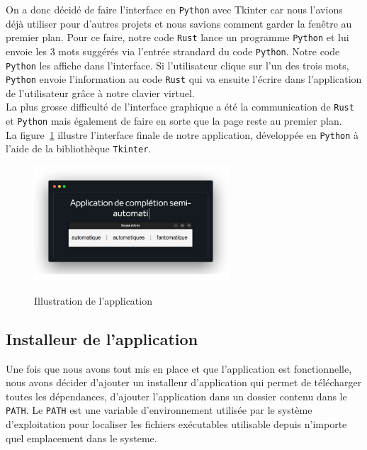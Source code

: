 \documentclass[a4paper, 11pt]{report}
\newcommand{\langage}[1]{\texttt{#1}}
\begin{document}
{On a donc décidé de faire l'interface en \langage{Python} avec Tkinter car nous l'avions déjà utiliser pour d'autres projets et nous savions comment garder la fenêtre au premier plan. Pour ce faire, notre code \langage{Rust} lance un programme \langage{Python} et lui envoie les 3 mots suggérés via l'entrée strandard du code \langage{Python}. Notre code \langage{Python} les affiche dans l'interface. Si l'utilisateur clique sur l'un des trois mots, \langage{Python} envoie l'information au code \langage{Rust} qui va ensuite l'écrire dans l'application de l'utilisateur grâce à notre clavier virtuel.\\

La plus grosse difficulté de l'interface graphique a été la communication de \langage{Rust} et \langage{Python} mais également de faire en sorte que la page reste au premier plan.\\

La figure~\ref{fig:lecture_fichier} illustre l’interface finale de notre application, développée en \langage{Python} à l’aide de la bibliothèque \langage{Tkinter}.

\begin{figure}[H]
	\begin{center}
		{\includegraphics[width=0.65\textwidth]{images/illustration.png}}
	\end{center}
	\caption{Illustration de l'application}
	\label{fig:lecture_fichier}
\end{figure}

\subsection{Installeur de l'application}

Une fois que nous avons tout mis en place et que l'application est fonctionnelle, nous avons décider d'ajouter un installeur d'application qui permet de télécharger toutes les dépendances, d'ajouter l'application dans un dossier contenu dans le \langage{PATH}. Le \langage{PATH} est une variable d'environnement utilisée par le système d'exploitation pour localiser les fichiers exécutables utilisable depuis n'importe quel emplacement dans le systeme.\\

}
\end{document}
